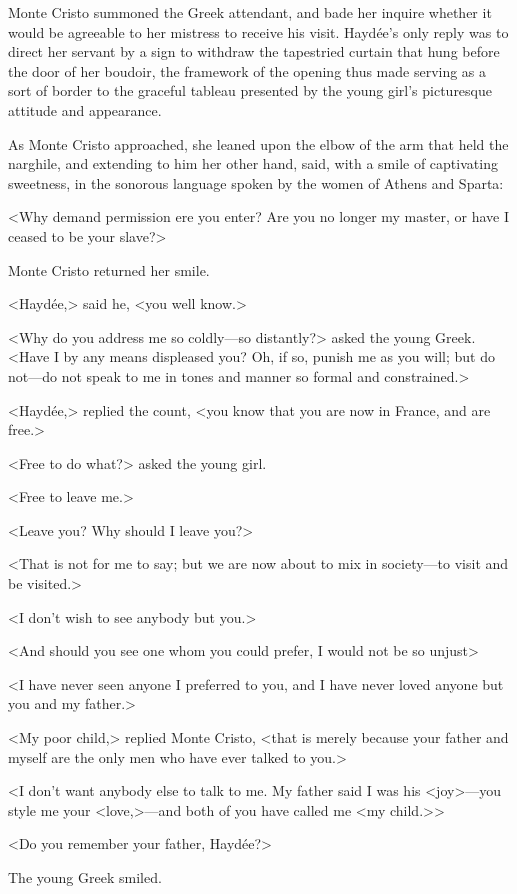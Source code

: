  Monte Cristo summoned the Greek attendant, and bade her inquire whether it would be agreeable to her mistress to receive his visit. Haydée's only reply was to direct her servant by a sign to withdraw the tapestried curtain that hung before the door of her boudoir, the framework of the opening thus made serving as a sort of border to the graceful tableau presented by the young girl's picturesque attitude and appearance. 

 As Monte Cristo approached, she leaned upon the elbow of the arm that held the narghile, and extending to him her other hand, said, with a smile of captivating sweetness, in the sonorous language spoken by the women of Athens and Sparta: 

 <Why demand permission ere you enter? Are you no longer my master, or have I ceased to be your slave?> 

 Monte Cristo returned her smile. 

 <Haydée,> said he, <you well know.> 

 <Why do you address me so coldly—so distantly?> asked the young Greek. <Have I by any means displeased you? Oh, if so, punish me as you will; but do not—do not speak to me in tones and manner so formal and constrained.> 

 <Haydée,> replied the count, <you know that you are now in France, and are free.> 

 <Free to do what?> asked the young girl. 

 <Free to leave me.> 

 <Leave you? Why should I leave you?> 

 <That is not for me to say; but we are now about to mix in society—to visit and be visited.> 

 <I don't wish to see anybody but you.> 

 <And should you see one whom you could prefer, I would not be so unjust\longdash> 

 <I have never seen anyone I preferred to you, and I have never loved anyone but you and my father.> 

 <My poor child,> replied Monte Cristo, <that is merely because your father and myself are the only men who have ever talked to you.> 

 <I don't want anybody else to talk to me. My father said I was his <joy>—you style me your <love,>—and both of you have called me <my child.>> 

 <Do you remember your father, Haydée?> 

 The young Greek smiled. 

